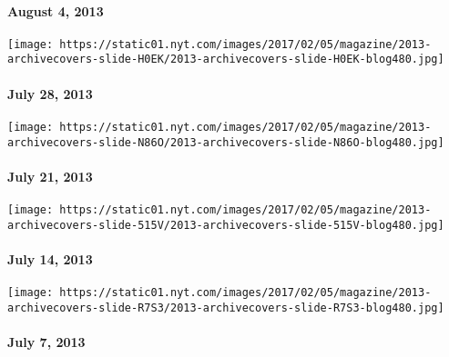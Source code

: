 \hypertarget{august-4-2013}{%
\paragraph{August 4, 2013}\label{august-4-2013}}

\href{http://www.nytimes.com/indexes/2013/07/28/magazine/index.html}{}

\texttt{[image: https://static01.nyt.com/images/2017/02/05/magazine/2013-archivecovers-slide-H0EK/2013-archivecovers-slide-H0EK-blog480.jpg]}

\hypertarget{july-28-2013}{%
\paragraph{July 28, 2013}\label{july-28-2013}}

\href{http://www.nytimes.com/indexes/2013/07/21/magazine/index.html}{}

\texttt{[image: https://static01.nyt.com/images/2017/02/05/magazine/2013-archivecovers-slide-N86O/2013-archivecovers-slide-N86O-blog480.jpg]}

\hypertarget{july-21-2013}{%
\paragraph{July 21, 2013}\label{july-21-2013}}

\href{http://www.nytimes.com/indexes/2013/07/14/magazine/index.html}{}

\texttt{[image: https://static01.nyt.com/images/2017/02/05/magazine/2013-archivecovers-slide-515V/2013-archivecovers-slide-515V-blog480.jpg]}

\hypertarget{july-14-2013}{%
\paragraph{July 14, 2013}\label{july-14-2013}}

\href{http://www.nytimes.com/indexes/2013/07/07/magazine/index.html}{}

\texttt{[image: https://static01.nyt.com/images/2017/02/05/magazine/2013-archivecovers-slide-R7S3/2013-archivecovers-slide-R7S3-blog480.jpg]}

\hypertarget{july-7-2013}{%
\paragraph{July 7, 2013}\label{july-7-2013}}

\href{http://www.nytimes.com/indexes/2013/06/30/magazine/index.html}{}

